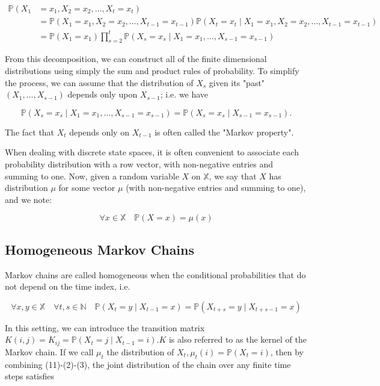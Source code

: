 \documentclass[10pt]{article}
\begin{document}
$$
\begin{aligned}
\mathbb{P}\left(X_{1}\right. & \left.=x_{1}, X_{2}=x_{2}, \ldots, X_{t}=x_{t}\right) \\
& =\mathbb{P}\left(X_{1}=x_{1}, X_{2}=x_{2}, \ldots, X_{t-1}=x_{t-1}\right) \mathbb{P}\left(X_{t}=x_{t} \mid X_{1}=x_{1}, X_{2}=x_{2}, \ldots, X_{t-1}=x_{t-1}\right) \\
& =\mathbb{P}\left(X_{1}=x_{1}\right) \prod_{s=2}^{t} \mathbb{P}\left(X_{s}=x_{s} \mid X_{1}=x_{1}, \ldots, X_{s-1}=x_{s-1}\right)
\end{aligned}
$$

From this decomposition, we can construct all of the finite dimensional distributions using simply the sum and product rules of probability. To simplify the process, we can assume that the distribution of $X_{s}$ given its "past" $\left(X_{1}, \ldots, X_{s-1}\right)$ depends only upon $X_{s-1}$; i.e. we have

$$
\mathbb{P}\left(X_{s}=x_{s} \mid X_{1}=x_{1}, \ldots, X_{s-1}=x_{s-1}\right)=\mathbb{P}\left(X_{s}=x_{s} \mid X_{s-1}=x_{s-1}\right) .
$$

The fact that $X_{t}$ depends only on $X_{t-1}$ is often called the "Markov property".

When dealing with discrete state spaces, it is often convenient to associate each probability distribution with a row vector, with non-negative entries and summing to one. Now, given a random variable $X$ on $\mathbb{X}$, we say that $X$ has distribution $\mu$ for some vector $\mu$ (with non-negative entries and summing to one), and we note:

$$
\forall x \in \mathbb{X} \quad \mathbb{P}(X=x)=\mu(x)
$$

\subsection{Homogeneous Markov Chains}
Markov chains are called homogeneous when the conditional probabilities that do not depend on the time index, i.e.

$$
\forall x, y \in \mathbb{X} \quad \forall t, s \in \mathbb{N} \quad \mathbb{P}\left(X_{t}=y \mid X_{t-1}=x\right)=\mathbb{P}\left(X_{t+s}=y \mid X_{t+s-1}=x\right)
$$

In this setting, we can introduce the transition matrix $K(i, j)=K_{i j}=\mathbb{P}\left(X_{t}=j \mid X_{t-1}=i\right) . K$ is also referred to as the kernel of the Markov chain. If we call $\mu_{t}$ the distribution of $X_{t}, \mu_{t}(i)=\mathbb{P}\left(X_{t}=i\right)$, then by combining (11)-(2)-(3), the joint distribution of the chain over any finite time steps satisfies
\end{document}
